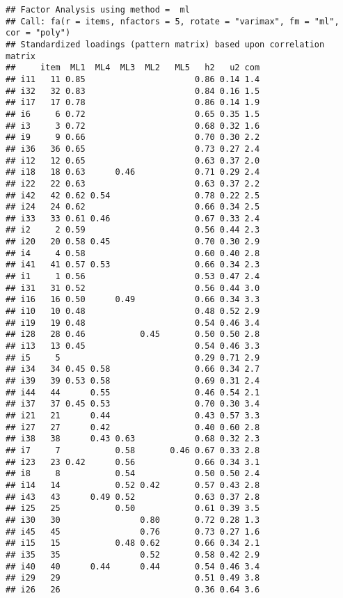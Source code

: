\documentclass[
]{article}
\begin{document}
\begin{verbatim}
## Factor Analysis using method =  ml
## Call: fa(r = items, nfactors = 5, rotate = "varimax", fm = "ml", cor = "poly")
## Standardized loadings (pattern matrix) based upon correlation matrix
##     item  ML1  ML4  ML3  ML2   ML5   h2   u2 com
## i11   11 0.85                      0.86 0.14 1.4
## i32   32 0.83                      0.84 0.16 1.5
## i17   17 0.78                      0.86 0.14 1.9
## i6     6 0.72                      0.65 0.35 1.5
## i3     3 0.72                      0.68 0.32 1.6
## i9     9 0.66                      0.70 0.30 2.2
## i36   36 0.65                      0.73 0.27 2.4
## i12   12 0.65                      0.63 0.37 2.0
## i18   18 0.63      0.46            0.71 0.29 2.4
## i22   22 0.63                      0.63 0.37 2.2
## i42   42 0.62 0.54                 0.78 0.22 2.5
## i24   24 0.62                      0.66 0.34 2.5
## i33   33 0.61 0.46                 0.67 0.33 2.4
## i2     2 0.59                      0.56 0.44 2.3
## i20   20 0.58 0.45                 0.70 0.30 2.9
## i4     4 0.58                      0.60 0.40 2.8
## i41   41 0.57 0.53                 0.66 0.34 2.3
## i1     1 0.56                      0.53 0.47 2.4
## i31   31 0.52                      0.56 0.44 3.0
## i16   16 0.50      0.49            0.66 0.34 3.3
## i10   10 0.48                      0.48 0.52 2.9
## i19   19 0.48                      0.54 0.46 3.4
## i28   28 0.46           0.45       0.50 0.50 2.8
## i13   13 0.45                      0.54 0.46 3.3
## i5     5                           0.29 0.71 2.9
## i34   34 0.45 0.58                 0.66 0.34 2.7
## i39   39 0.53 0.58                 0.69 0.31 2.4
## i44   44      0.55                 0.46 0.54 2.1
## i37   37 0.45 0.53                 0.70 0.30 3.4
## i21   21      0.44                 0.43 0.57 3.3
## i27   27      0.42                 0.40 0.60 2.8
## i38   38      0.43 0.63            0.68 0.32 2.3
## i7     7           0.58       0.46 0.67 0.33 2.8
## i23   23 0.42      0.56            0.66 0.34 3.1
## i8     8           0.54            0.50 0.50 2.4
## i14   14           0.52 0.42       0.57 0.43 2.8
## i43   43      0.49 0.52            0.63 0.37 2.8
## i25   25           0.50            0.61 0.39 3.5
## i30   30                0.80       0.72 0.28 1.3
## i45   45                0.76       0.73 0.27 1.6
## i15   15           0.48 0.62       0.66 0.34 2.1
## i35   35                0.52       0.58 0.42 2.9
## i40   40      0.44      0.44       0.54 0.46 3.4
## i29   29                           0.51 0.49 3.8
## i26   26                           0.36 0.64 3.6

\end{verbatim}
\end{document}
